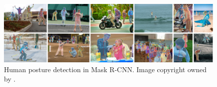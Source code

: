 \begin{figure}[!h]
	\centering
	\includegraphics[width=\fig\textwidth]{5-03.pdf}
    \caption[Human posture detection in Mask R-CNN]{Human posture detection in Mask R-CNN. Image copyright owned by \cite{maskrcnn}.}
	\label{fig:posdet}
\end{figure}